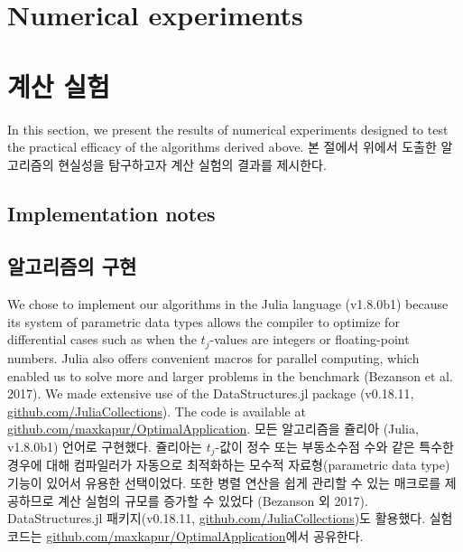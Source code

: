 \documentclass[11pt]{article} %
\theoremstyle{definition}
\theoremstyle{definition}
\begin{document}




\ifen \section{Numerical experiments} \else \section{계산 실험}\fi\label{numericalexperiments}
\ifen
In this section, we present the results of numerical experiments designed to test the practical efficacy of the algorithms derived above. 
\else
본 절에서 위에서 도출한 알고리즘의 현실성을 탐구하고자 계산 실험의 결과를 제시한다.
\fi

\ifen \subsection{Implementation notes} \else \subsection{알고리즘의 구현}\fi
\ifen
We chose to implement our algorithms in the Julia language (v1.8.0b1) because its system of parametric data types allows the compiler to optimize for differential cases such as when the $t_j$-values are integers or floating-point numbers. Julia also offers convenient macros for parallel computing, which enabled us to solve more and larger problems in the benchmark (Bezanson et al. 2017). We made extensive use of the DataStructures.jl package (v0.18.11, \url{github.com/JuliaCollections}). The code is available at \url{github.com/maxkapur/OptimalApplication}.
\else
모든 알고리즘을 쥴리아 (Julia, v1.8.0b1) 언어로 구현했다. 쥴리아는 $t_j$-값이 정수 또는 부동소수점 수와 같은 특수한 경우에 대해 컴파일러가 자동으로 최적화하는 모수적 자료형(parametric data type) 기능이 있어서 유용한 선택이었다. 또한 병렬 연산을 쉽게 관리할 수 있는 매크로를 제공하므로 계산 실험의 규모를 증가할 수 있었다 (Bezanson 외 2017). DataStructures.jl 패키지(v0.18.11, \url{github.com/JuliaCollections})도 활용했다. 실험 코드는  \url{github.com/maxkapur/OptimalApplication}에서 공유한다.
\fi
\end{document}
